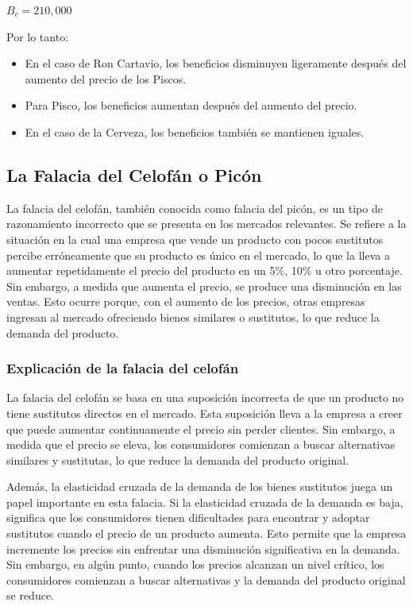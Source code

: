 \documentclass[
  a4paper,
]{article}
\providecommand{\tightlist}{%
  \setlength{\itemsep}{0pt}\setlength{\parskip}{0pt}}\usepackage{longtable,booktabs,array}
\begin{document}
\(B_c = 210,000\)

Por lo tanto:

\begin{itemize}
\tightlist
\item
  En el caso de Ron Cartavio, los beneficios disminuyen ligeramente
  después del aumento del precio de los Piscos.
\item
  Para Pisco, los beneficios aumentan después del aumento del precio.
\item
  En el caso de la Cerveza, los beneficios también se mantienen iguales.
\end{itemize}

\hypertarget{la-falacia-del-celofuxe1n-o-picuxf3n}{%
\subsection{La Falacia del Celofán o
Picón}\label{la-falacia-del-celofuxe1n-o-picuxf3n}}

La falacia del celofán, también conocida como falacia del picón, es un
tipo de razonamiento incorrecto que se presenta en los mercados
relevantes. Se refiere a la situación en la cual una empresa que vende
un producto con pocos sustitutos percibe erróneamente que su producto es
único en el mercado, lo que la lleva a aumentar repetidamente el precio
del producto en un 5\%, 10\% u otro porcentaje. Sin embargo, a medida
que aumenta el precio, se produce una disminución en las ventas. Esto
ocurre porque, con el aumento de los precios, otras empresas ingresan al
mercado ofreciendo bienes similares o sustitutos, lo que reduce la
demanda del producto.

\hypertarget{explicaciuxf3n-de-la-falacia-del-celofuxe1n}{%
\subsubsection{Explicación de la falacia del
celofán}\label{explicaciuxf3n-de-la-falacia-del-celofuxe1n}}

La falacia del celofán se basa en una suposición incorrecta de que un
producto no tiene sustitutos directos en el mercado. Esta suposición
lleva a la empresa a creer que puede aumentar continuamente el precio
sin perder clientes. Sin embargo, a medida que el precio se eleva, los
consumidores comienzan a buscar alternativas similares y sustitutas, lo
que reduce la demanda del producto original.

Además, la elasticidad cruzada de la demanda de los bienes sustitutos
juega un papel importante en esta falacia. Si la elasticidad cruzada de
la demanda es baja, significa que los consumidores tienen dificultades
para encontrar y adoptar sustitutos cuando el precio de un producto
aumenta. Esto permite que la empresa incremente los precios sin
enfrentar una disminución significativa en la demanda. Sin embargo, en
algún punto, cuando los precios alcanzan un nivel crítico, los
consumidores comienzan a buscar alternativas y la demanda del producto
original se reduce.
\end{document}
